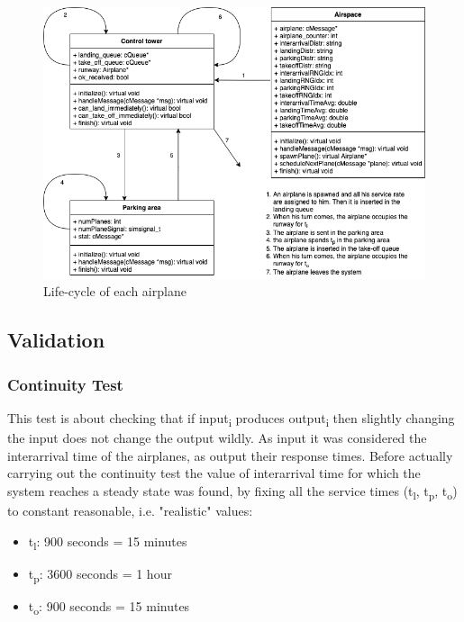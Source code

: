 \documentclass[12pt]{article}
\begin{document}
\begin{figure}[H]
    \centering
    \includegraphics[scale=0.45]{immagini/lifecycle}
    \caption{Life-cycle of each airplane}
    \label{Fig:life-cycle of each airplane}
\end{figure}

\subsection{Validation}

\subsubsection{Continuity Test}

This test is about checking that if input\textsubscript{i} produces output\textsubscript{i} then slightly changing the input does not change the output wildly.
As input it was considered the interarrival time of the airplanes, as output their response times. 
Before actually carrying out the continuity test the value of interarrival time for which the system reaches a steady state was found, by fixing all the service times (t\textsubscript{l}, t\textsubscript{p}, t\textsubscript{o}) to constant reasonable, i.e. "realistic" values:

\begin{itemize}
    \item t\textsubscript{l}: 900 seconds = 15 minutes
    \item t\textsubscript{p}: 3600 seconds = 1 hour
    \item t\textsubscript{o}: 900 seconds = 15 minutes
\end{itemize}
\end{document}
